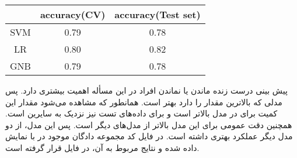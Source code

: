 \documentclass[11pt]{article}
\begin{document}
\begin{latin}
\begin{table}[h]
{\begin{center}
\begin{tabular}{|c|c|c|c|}
		\hline
		\end{tabular}
		\end{center}
		}
		\parbox{0.1\linewidth}{
		\begin{center}
			\begin{tabular}{|c|c|c|}
				\hline
				& accuracy(CV)& accuracy(Test set) \\
				\hline
				SVM & 0.79 & 0.78\\
				LR & 0.80  & 0.82\\
				GNB & 0.79 & 0.78\\
				\hline
			\end{tabular}
		\end{center}			
		}
	\end{table}
\end{latin}

پیش بینی درست زنده ماندن یا نماندن افراد در این مسأله اهمیت بیشتری دارد. پس مدلی که بالاترین مقدار  را دارد بهتر است. همانطور که مشاهده می‌شود مقدار این کمیت برای 
 در مدل
بالاتر است و برای داده‌های تست نیز نزدیک به سایرین است. همچنین دقت عمومی  
برای این مدل بالاتر از مدل‌های دیگر است. پس این مدل، از دو مدل دیگر عملکرد بهتری داشته است. در فایل کد مجموعه دادگان موجود در 
با 
نمایش داده شده و نتایج مربوط به آن، در فایل 
قرار گرفته است.
\end{document}
